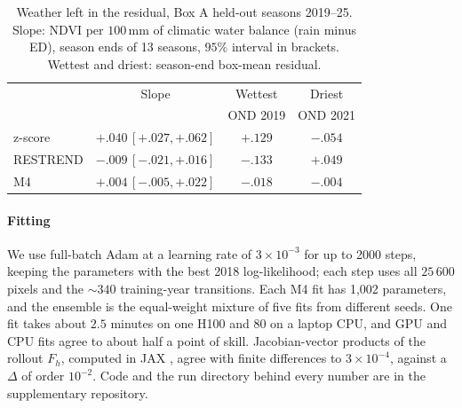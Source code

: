 \documentclass[letterpaper]{article} %
\begin{document}
\begin{table}[t]\centering\footnotesize\setlength{\tabcolsep}{4pt}
\caption{Weather left in the residual, Box A held-out seasons 2019--25. Slope: NDVI per $100$\,mm of climatic water balance (rain minus ED), season ends of 13 seasons, $95\%$ interval in brackets. Wettest and driest: season-end box-mean residual.}\label{tab:bias}
\begin{tabular}{lccc}\toprule
 & Slope & Wettest & Driest\\
 & & OND 2019 & OND 2021\\\midrule
z-score & $+.040$\,{\scriptsize$[+.027,+.062]$} & $+.129$ & $-.054$\\
RESTREND & $-.009$\,{\scriptsize$[-.021,+.016]$} & $-.133$ & $+.049$\\
M4 & $+.004$\,{\scriptsize$[-.005,+.022]$} & $-.018$ & $-.004$\\\bottomrule
\end{tabular}
\end{table}

\paragraph{Fitting} We use full-batch Adam \citep{kingma2015} at a learning rate of $3\times10^{-3}$ for up to 2000 steps, keeping the parameters with the best 2018 log-likelihood; each step uses all $25\,600$ pixels and the $\sim340$ training-year transitions. Each M4 fit has 1,002 parameters, and the ensemble is the equal-weight mixture of five fits from different seeds. One fit takes about $2.5$ minutes on one H100 and $80$ on a laptop CPU, and GPU and CPU fits agree to about half a point of skill. Jacobian-vector products of the rollout $F_h$, computed in JAX \citep{jax2018}, agree with finite differences to $3\times10^{-4}$, against a $\Delta$ of order $10^{-2}$. Code and the run directory behind every number are in the supplementary repository.

\end{document}
